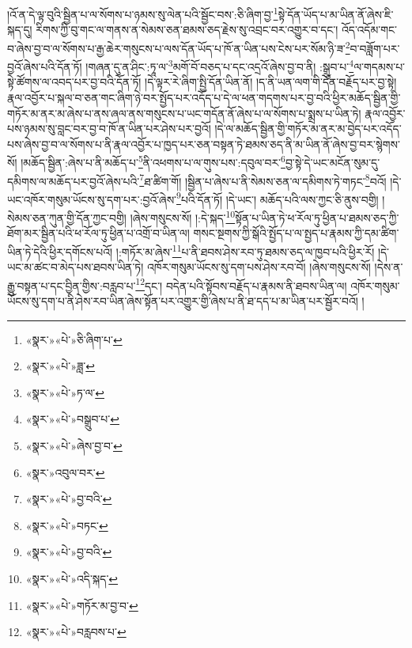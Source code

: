 །འོ་ན་དེ་ལྟ་བུའི་སྦྱིན་པ་ལ་སོགས་པ་ཉམས་སུ་ལེན་པའི་སྦྱོང་བས་:ཅི་ཞིག་བྱ་\footnote{«སྣར་»«པེ་»ཅི་ཞིག་པ་}སྟེ་དོན་ཡོད་པ་མ་ཡིན་ནོ་ཞེས་ཇི་སྐད་དུ། རིགས་ཀྱི་བུ་གང་ལ་གནས་ན་སེམས་ཅན་ཐམས་ཅད་རྗེས་སུ་འབྲང་བར་འགྱུར་བ་དང་། འོད་འདོམ་གང་བ་ཞེས་བྱ་བ་ལ་སོགས་པ་རྒྱ་ཆེར་གསུངས་པ་ལས་དོན་ཡོད་པ་ཁོ་ན་ཡིན་པས་ངེས་པར་སོམ་ཉི་ཟ་\footnote{«སྣར་»«པེ་»ཟླ་}བ་བཟློག་པར་བྱའོ་ཞེས་པའི་དོན་ཏོ། །གཞན་དུ་ན་ཤིང་:ཏཱ་ལ་\footnote{«སྣར་»«པེ་»ཏ་ལ་}མགོ་བོ་བཅད་པ་དང་འདྲའོ་ཞེས་བྱ་བ་ནི། :སྒྲུབ་པ་\footnote{«སྣར་»«པེ་»བསྒྲུབ་པ་}ལ་གདམས་པ་སྟེ་ཚོགས་ལ་འབད་པར་བྱ་བའི་དོན་ཏོ། །དེ་ལྟར་རེ་ཞིག་སྤྱི་དོན་ཡིན་ནོ། །ད་ནི་ཡན་ལག་གི་དོན་བརྗོད་པར་བྱ་སྟེ། རྣལ་འབྱོར་པ་སྐལ་བ་ཅན་གང་ཞིག་ཉེ་བར་སྤྱོད་པར་འདོད་པ་དེ་ལ་ཕན་གདགས་པར་བྱ་བའི་ཕྱིར་མཆོད་སྦྱིན་གྱི་གཏོར་མ་ནར་མ་ཞེས་པ་ནས་ཞལ་ནས་གསུངས་པ་ཡང་གདོན་ནོ་ཞེས་པ་ལ་སོགས་པ་སྨྲས་པ་ཡིན་ཏེ། རྣལ་འབྱོར་པས་ཉམས་སུ་བླང་བར་བྱ་བ་ཁོ་ན་ཡིན་པར་ཤེས་པར་བྱའོ། །དེ་ལ་མཆོད་སྦྱིན་གྱི་གཏོར་མ་ནར་མ་བྱེད་པར་འདོད་པས་ཞེས་བྱ་བ་ལ་སོགས་པ་ནི་རྣལ་འབྱོར་པ་ཁྱད་པར་ཅན་བསྟན་ཏེ་ཐམས་ཅད་ནི་མ་ཡིན་ནོ་ཞེས་བྱ་བར་སྙེགས་སོ། །མཆོད་སྦྱིན་:ཞེས་པ་ནི་མཆོད་པ་\footnote{«སྣར་»«པེ་»ཞེས་བྱ་བ་}ནི་འཕགས་པ་ལ་གུས་པས་:དབུལ་བར་\footnote{«སྣར་»འབུལ་བར་}བྱ་སྟེ་དེ་ཡང་མངོན་སུམ་དུ་དམིགས་ལ་མཆོད་པར་བྱའོ་ཞེས་པའི་\footnote{«སྣར་»«པེ་»བྱ་བའི་}ཐ་ཚིག་གོ། །སྦྱིན་པ་ཞེས་པ་ནི་སེམས་ཅན་ལ་དམིགས་ཏེ་གཏང་\footnote{«སྣར་»«པེ་»བཏང་}བའོ། །དེ་ཡང་འཁོར་གསུམ་ཡོངས་སུ་དག་པར་:བྱའོ་ཞེས་\footnote{«སྣར་»«པེ་»བྱ་བའི་}པའི་དོན་ཏོ། །དེ་ཡང་། མཆོད་པའི་ལས་ཀྱང་ཅི་ནུས་བགྱི། །སེམས་ཅན་ཀུན་གྱི་དོན་ཀྱང་བགྱི། །ཞེས་གསུངས་སོ། །:དེ་སྐད་\footnote{«སྣར་»«པེ་»འདི་སྐད་}སྟོན་པ་ཡིན་ཏེ་ཕ་རོལ་ཏུ་ཕྱིན་པ་ཐམས་ཅད་ཀྱི་ཐོག་མར་སྦྱིན་པའི་ཕ་རོལ་ཏུ་ཕྱིན་པ་འགྲོ་བ་ཡིན་ལ། གསང་སྔགས་ཀྱི་སྒོའི་སྤྱོད་པ་ལ་སྤྱད་པ་རྣམས་ཀྱི་དམ་ཚིག་ཡིན་ཏེ་དེའི་ཕྱིར་དགོངས་པའོ། །:གཏོར་མ་ཞེས་\footnote{«སྣར་»«པེ་»གཏོར་མ་བྱ་བ་}པ་ནི་ཐབས་ཤེས་རབ་ཏུ་ཐམས་ཅད་ལ་ཁྱབ་པའི་ཕྱིར་རོ། །དེ་ཡང་མ་ཚང་བ་མེད་པས་ཐབས་ཡིན་ཏེ། འཁོར་གསུམ་ཡོངས་སུ་དག་པས་ཤེས་རབ་བོ། །ཞེས་གསུངས་སོ། །དེས་ན་རྒྱུ་བསྟན་པ་དང་བྱིན་གྱིས་:བརླབ་པ་\footnote{«སྣར་»«པེ་»བརླབས་པ་}དང་། བདེན་པའི་སྟོབས་བརྗོད་པ་རྣམས་ནི་ཐབས་ཡིན་ལ། འཁོར་གསུམ་ཡོངས་སུ་དག་པ་ནི་ཤེས་རབ་ཡིན་ཞེས་སྟོན་པར་འགྱུར་གྱི་ཞེས་པ་ནི་ཐ་དད་པ་མ་ཡིན་པར་སྦྱོར་བའོ། །
